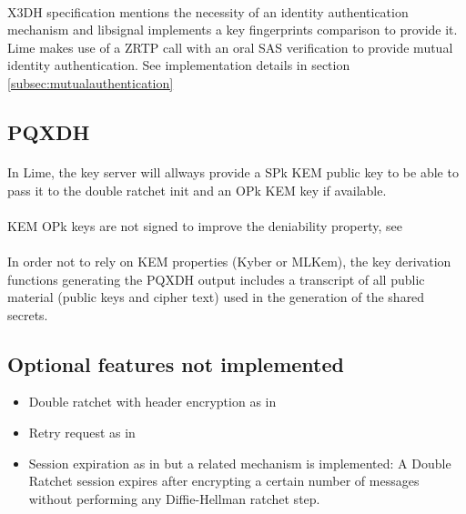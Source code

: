\documentclass[a4paper,11pt]{article}
\begin{document}
  \paragraph*{}X3DH specification mentions \cite[section 4.1]{x3dh} the necessity of an identity authentication mechanism and libsignal\cite{libsignal} implements a key fingerprints comparison to provide it. Lime makes use of a ZRTP\cite{zrtp} call with an oral SAS verification to provide mutual identity authentication. See implementation details in section \ref{subsec:mutualauthentication}

  \subsection{PQXDH}
  \paragraph*{}In Lime, the key server will allways provide a SPk KEM public key to be able to pass it to the double ratchet init and an OPk KEM key if available.
  \paragraph*{}KEM OPk keys are not signed to improve the deniability property, see \cite{PQXDHdeniabilty}
  \paragraph*{}In order not to rely on KEM properties (Kyber or MLKem), the key derivation functions generating the PQXDH output includes a transcript of all public material (public keys and cipher text) used in the generation of the shared secrets.

  \subsection{Optional features not implemented}
    \begin{itemize}
      \item Double ratchet with header encryption as in \cite[section 4]{doubleRatchet}
      \item Retry request as in \cite[section 4.1]{sesame}
      \item Session expiration as in \cite[section 4.2]{sesame} but a related mechanism is implemented: A Double Ratchet session expires after encrypting a certain number of messages without performing any Diffie-Hellman ratchet step.
    \end{itemize}
\end{document}
